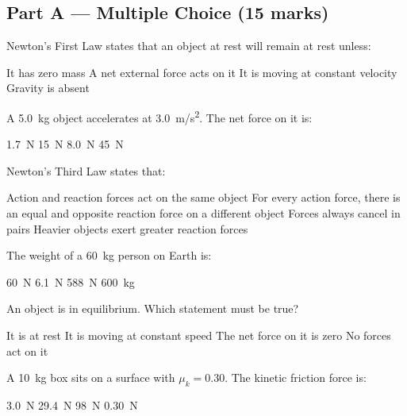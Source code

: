 \documentclass[addpoints]{exam}
\begin{document}
\newpage
\begin{questions}

\section*{Part A --- Multiple Choice (15 marks)}
\vspace{5mm}

\question[1] Newton's First Law states that an object at rest will remain at rest unless:
\begin{choices}
    \choice It has zero mass
    \correctchoice A net external force acts on it
    \choice It is moving at constant velocity
    \choice Gravity is absent
\end{choices}

\question[1] A \SI{5.0}{kg} object accelerates at \SI{3.0}{m/s^2}. The net force on it is:
\begin{choices}
    \choice \SI{1.7}{N}
    \correctchoice \SI{15}{N}
    \choice \SI{8.0}{N}
    \choice \SI{45}{N}
\end{choices}

\question[1] Newton's Third Law states that:
\begin{choices}
    \choice Action and reaction forces act on the same object
    \correctchoice For every action force, there is an equal and opposite reaction force on a different object
    \choice Forces always cancel in pairs
    \choice Heavier objects exert greater reaction forces
\end{choices}

\question[1] The weight of a \SI{60}{kg} person on Earth is:
\begin{choices}
    \choice \SI{60}{N}
    \choice \SI{6.1}{N}
    \correctchoice \SI{588}{N}
    \choice \SI{600}{kg}
\end{choices}

\question[1] An object is in equilibrium. Which statement must be true?
\begin{choices}
    \choice It is at rest
    \choice It is moving at constant speed
    \correctchoice The net force on it is zero
    \choice No forces act on it
\end{choices}

\question[1] A \SI{10}{kg} box sits on a surface with $\mu_k = 0.30$. The kinetic friction
force is:
\begin{choices}
    \choice \SI{3.0}{N}
    \correctchoice \SI{29.4}{N}
    \choice \SI{98}{N}
    \choice \SI{0.30}{N}
\end{choices}


\end{questions}
\end{document}
